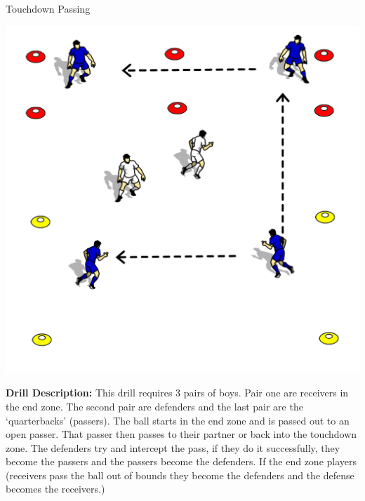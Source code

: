 \begin{evenBlock}{Touchdown Passing}
\begin{minipage}[t]{\linewidth}
    \begin{minipage}{.3\linewidth} %
        \centering
        \includegraphics[width=.7\textwidth]{../img/Trimmed/TouchDownPassing}
    \end{minipage}
    \hspace{0.05\linewidth}
    \begin{minipage}{.6\linewidth} %
        \textbf{Drill Description:}
        This drill requires 3 pairs of boys.  Pair one are receivers in the end zone.  The second pair are defenders and the last pair are the `quarterbacks' (passers).  The ball starts in the end zone and is passed out to an open passer.  That passer then passes to their partner or back into the touchdown zone. The defenders try and intercept the pass, if they do it successfully, they become the passers and the passers become the defenders.  If the end zone players (receivers pass the ball out of bounds they become the defenders and the defense becomes the receivers.)

\end{minipage}
\end{minipage}
\end{evenBlock}
